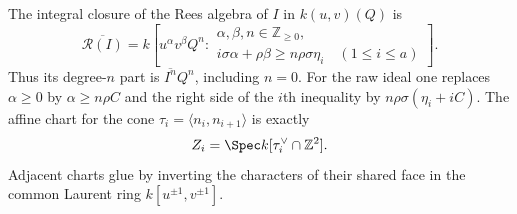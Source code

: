 \begin{proposition}
\label{prop:ramified-rees-v170}
The integral closure of the Rees algebra of $I$ in $k(u,v)(Q)$ is
\begin{equation}\label{eq:ramified-rees-v170}
 \overline{\mathcal R(I)}
 =k\left[u^\alpha v^\beta Q^n:
 \begin{array}{l}
 \alpha,\beta,n\in\mathbb Z_{\geq0},\\
 i\sigma\alpha+\rho\beta\geq n\rho\sigma\eta_i
                  \quad(1\leq i\leq a)
 \end{array}\right].
\end{equation}
Thus its degree-$n$ part is $\overline{I^n}Q^n$, including $n=0$.
For the raw ideal one replaces $\alpha\geq0$ by
$\alpha\geq n\rho C$ and the right side of the $i$th inequality by
$n\rho\sigma(\eta_i+iC)$. The affine chart for the cone
$\tau_i=\langle n_i,n_{i+1}\rangle$ is exactly
\begin{equation}\label{eq:normal-chart-v170}
 Z_i=\Spec k[\tau_i^\vee\cap\mathbb Z^2].
\end{equation}
Adjacent charts glue by inverting the characters of their shared
face in the common Laurent ring $k[u^{\pm1},v^{\pm1}]$.
\end{proposition}
